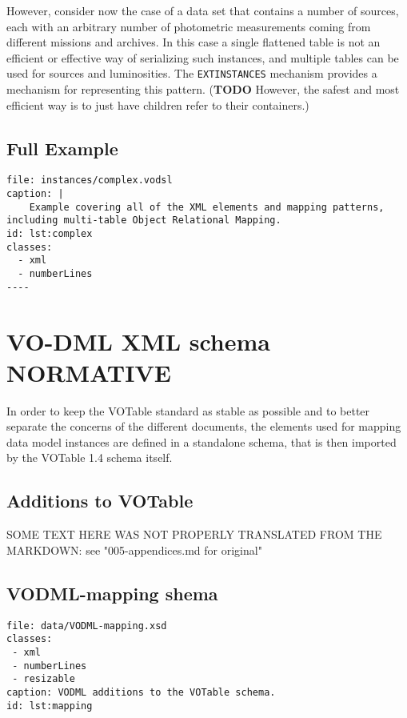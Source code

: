 \documentclass[11pt,a4paper]{ivoa}
\begin{document}
However, consider now the case of a data set that contains a number of
sources, each with an arbitrary number of photometric measurements
coming from different missions and archives. In this case a single
flattened table is not an efficient or effective way of serializing such
instances, and multiple tables can be used for sources and luminosities.
The \texttt{EXTINSTANCES} mechanism provides a mechanism for
representing this pattern. (\textbf{TODO} However, the safest and most
efficient way is to just have children refer to their containers.)

\subsection{Full Example}\label{full-example}

\begin{verbatim}
file: instances/complex.vodsl
caption: |
    Example covering all of the XML elements and mapping patterns, including multi-table Object Relational Mapping.
id: lst:complex
classes:
  - xml
  - numberLines
----
\end{verbatim}
\section{VO-DML XML schema NORMATIVE}\label{sec:schema}

In order to keep the VOTable standard as stable as possible and to
better separate the concerns of the different documents, the elements
used for mapping data model instances are defined in a standalone
schema, that is then imported by the VOTable 1.4 schema itself.

\subsection{Additions to VOTable}\label{additions-to-votable}

SOME TEXT HERE WAS NOT PROPERLY TRANSLATED FROM THE MARKDOWN: see "005-appendices.md for original"

\subsection{VODML-mapping shema}\label{vodml-mapping-shema}

\begin{verbatim}
file: data/VODML-mapping.xsd
classes:
 - xml
 - numberLines
 - resizable
caption: VODML additions to the VOTable schema.
id: lst:mapping
\end{verbatim}

\pagebreak

\end{document}
